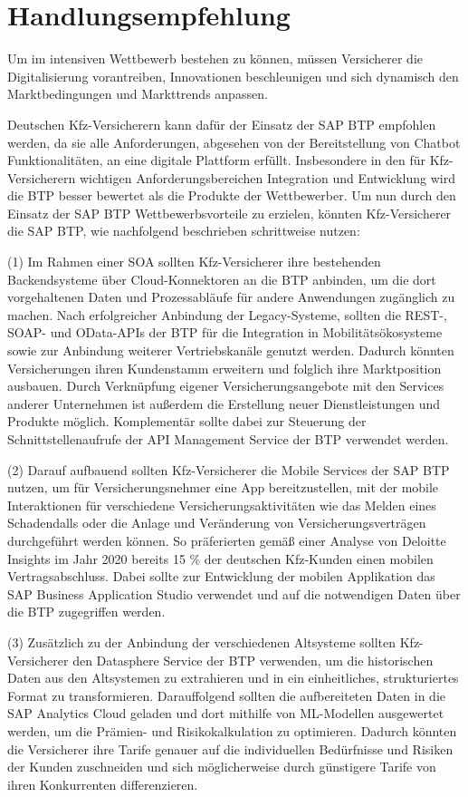 \chapter{Handlungsempfehlung}

Um im intensiven Wettbewerb bestehen zu können, müssen Versicherer die Digitalisierung  vorantreiben, Innovationen beschleunigen und sich dynamisch den Marktbedingungen und Markttrends anpassen.

Deutschen Kfz-Versicherern kann dafür der Einsatz der SAP BTP empfohlen werden, da sie alle Anforderungen, abgesehen von der Bereitstellung von Chatbot Funktionalitäten, an eine digitale Plattform erfüllt. Insbesondere in den für Kfz-Versicherern wichtigen Anforderungsbereichen Integration und Entwicklung wird die BTP besser bewertet als die Produkte der Wettbewerber. Um nun durch den Einsatz der SAP BTP Wettbewerbsvorteile zu erzielen, könnten Kfz-Versicherer die SAP BTP, wie nachfolgend beschrieben schrittweise nutzen:

(1) Im Rahmen einer SOA sollten Kfz-Versicherer ihre bestehenden Backendsysteme über Cloud-Konnektoren an die BTP anbinden, um die dort vorgehaltenen Daten und Prozessabläufe für andere Anwendungen zugänglich zu machen. Nach erfolgreicher Anbindung der Legacy-Systeme, sollten die REST-, SOAP- und OData-APIs der BTP für die Integration in Mobilitätsökosysteme sowie zur Anbindung weiterer Vertriebskanäle genutzt werden. Dadurch könnten Versicherungen ihren Kundenstamm erweitern und folglich ihre Marktposition ausbauen. Durch Verknüpfung eigener Versicherungsangebote mit den Services anderer Unternehmen ist außerdem die Erstellung neuer Dienstleistungen und Produkte möglich. Komplementär sollte dabei zur Steuerung der Schnittstellenaufrufe der API Management Service der BTP verwendet werden.

(2) Darauf aufbauend sollten Kfz-Versicherer die Mobile Services der SAP BTP nutzen, um für Versicherungsnehmer eine App bereitzustellen, mit der mobile Interaktionen für verschiedene Versicherungsaktivitäten wie das Melden eines Schadendalls oder die Anlage und Veränderung von Versicherungsverträgen durchgeführt werden können. So präferierten gemäß einer Analyse von Deloitte Insights im Jahr 2020 bereits 15 \% der deutschen Kfz-Kunden einen mobilen Vertragsabschluss.\autocite[Vgl.][S. 15]{BAUMANN2020} Dabei sollte zur Entwicklung der mobilen Applikation das SAP Business Application Studio verwendet und auf die notwendigen Daten über die BTP zugegriffen werden. 

(3) Zusätzlich zu der Anbindung der verschiedenen Altsysteme sollten Kfz-Versicherer den Datasphere Service der BTP verwenden, um die historischen Daten aus den Altsystemen zu extrahieren und in ein einheitliches, strukturiertes Format zu transformieren. Darauffolgend sollten die aufbereiteten Daten in die SAP Analytics Cloud geladen und dort mithilfe von ML-Modellen ausgewertet werden, um die Prämien- und Risikokalkulation zu optimieren. Dadurch könnten die Versicherer ihre Tarife genauer auf die individuellen Bedürfnisse und Risiken der Kunden zuschneiden und sich möglicherweise durch günstigere Tarife von ihren Konkurrenten differenzieren.

